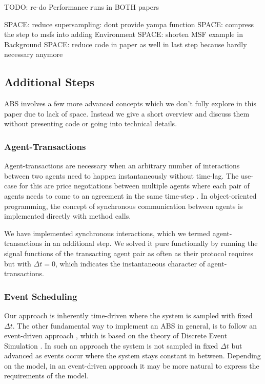 TODO: re-do Performance runs in BOTH papers

SPACE: reduce supersampling: dont provide yampa function
SPACE: compress the step to msfs into adding Environment
SPACE: shorten MSF example in Background
SPACE: reduce code in paper as well in last step because hardly necessary anymore







\subsection{Additional Steps}
ABS involves a few more advanced concepts which we don't fully explore in this paper due to lack of space. Instead we give a short overview and discuss them without presenting code or going into technical details.

\subsubsection{Agent-Transactions}
Agent-transactions are necessary when an arbitrary number of interactions between two agents need to happen instantaneously without time-lag. The use-case for this are price negotiations between multiple agents where each pair of agents needs to come to an agreement in the same time-step \cite{epstein_growing_1996}. In object-oriented programming, the concept of synchronous communication between agents is implemented directly with method calls.

We have implemented synchronous interactions, which we termed agent-transactions in an additional step. We solved it pure functionally by running the signal functions of the transacting agent pair as often as their protocol requires but with $\Delta t=0$, which indicates the instantaneous character of agent-transactions.

\subsubsection{Event Scheduling}
Our approach is inherently time-driven where the system is sampled with fixed $\Delta t$. The other fundamental way to implement an ABS in general, is to follow an event-driven approach \cite{meyer_event-driven_2014}, which is based on the theory of Discrete Event Simulation \cite{zeigler_theory_2000}. In such an approach the system is not sampled in fixed $\Delta t$ but advanced as events occur where the system stays constant in between. Depending on the model, in an event-driven approach it may be more natural to express the requirements of the model.

